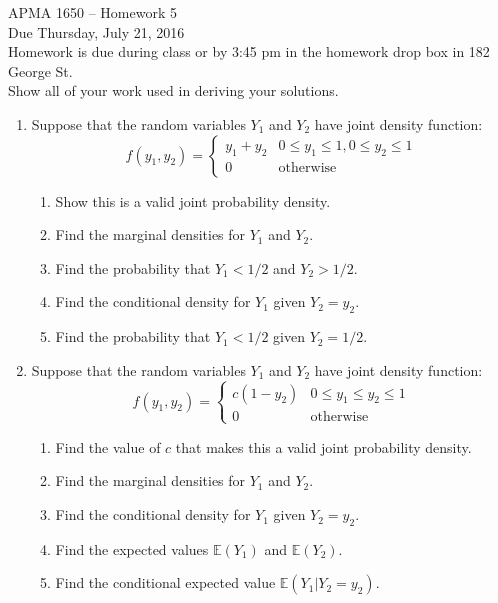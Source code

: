 \documentclass[12pt]{article}
\def\E{{\mathbb E}}
\begin{document}
\title{}
\author{\vspace{-10ex} }

\begin{center}
{\LARGE APMA 1650 -- Homework 5}\\
\vspace{5mm}
{\large Due Thursday, July 21, 2016}\\
\vspace{5mm}
Homework is due during class or by 3:45 pm in the homework drop box in 182 George St.\\
Show all of your work used in deriving your solutions.
\end{center}

\begin{enumerate}

\item Suppose that the random variables $Y_1$ and $Y_2$ have joint density function:\
\[
f(y_1, y_2) = \begin{cases}
y_1 + y_2 & 0 \leq y_1 \leq 1, 0 \leq y_2 \leq 1 \\
0 & \text{otherwise}
\end{cases}
\]
\begin{enumerate}
\item Show this is a valid joint probability density. 
\item Find the marginal densities for $Y_1$ and $Y_2$.
\item Find the probability that $Y_1 < 1/2$ and $Y_2 > 1/2$.
\item Find the conditional density for $Y_1$ given $Y_2 = y_2$.
\item Find the probability that $Y_1 < 1/2$ given $Y_2 = 1/2$.
\end{enumerate}

\item Suppose that the random variables $Y_1$ and $Y_2$ have joint density function:\
\[
f(y_1, y_2) = \begin{cases}
c(1 - y_2) & 0 \leq y_1 \leq y_2 \leq 1 \\
0 & \text{otherwise}
\end{cases}
\]
\begin{enumerate}
\item Find the value of $c$ that makes this a valid joint probability density. 
\item Find the marginal densities for $Y_1$ and $Y_2$.
\item Find the conditional density for $Y_1$ given $Y_2 = y_2$.
\item Find the expected values $\E(Y_1)$ and $\E(Y_2)$.
\item Find the conditional expected value $\E(Y_1 | Y_2 = y_2)$.
\end{enumerate}


\end{enumerate}
\end{document}

